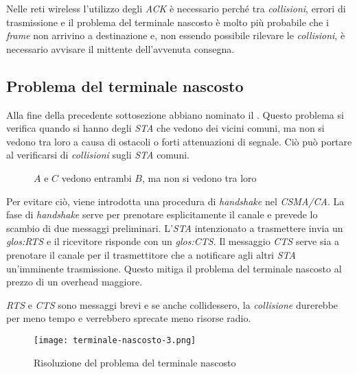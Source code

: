 \begin{note}
    Nelle reti wireless l'utilizzo degli \emph{ACK} è necessario perché
    tra \emph{collisioni}, errori di trasmissione e il problema del terminale
    nascosto è molto più probabile che i \emph{frame} non arrivino a destinazione
    e, non essendo possibile rilevare le \emph{collisioni}, è necessario avvisare
    il mittente dell'avvenuta consegna.
\end{note}

\subsection{Problema del terminale nascosto}
Alla fine della precedente sottosezione abbiano nominato il . Questo problema si verifica quando si hanno degli
\emph{STA} che vedono dei vicini comuni, ma non si vedono tra loro a causa di
ostacoli o forti attenuazioni di segnale. Ciò può portare al verificarsi di
\emph{collisioni} sugli \emph{STA} comuni.

\begin{figure}[h!]
    \centering
    \caption{$A$ e $C$ vedono entrambi $B$, ma non si vedono tra loro}
\end{figure}\noindent
Per evitare ciò, viene introdotta una procedura di \emph{handshake}
nel \emph{CSMA/CA}. La fase di \emph{handshake} serve per prenotare esplicitamente
il canale e prevede lo scambio di due messaggi preliminari. L'\emph{STA}
intenzionato a trasmettere invia un \emph{\gls{glos:RTS}} e il ricevitore
risponde con un \emph{\gls{glos:CTS}}. Il messaggio \emph{CTS} serve sia a
prenotare il canale per il trasmettitore che a notificare agli altri \emph{STA}
un'imminente trasmissione. Questo mitiga il problema del terminale nascosto al
prezzo di un overhead maggiore.

\begin{note}
    \emph{RTS} e \emph{CTS} sono messaggi brevi e se anche collidessero, la
    \emph{collisione} durerebbe per meno tempo e verrebbero sprecate meno
    risorse radio.
\end{note}

\newpage
\begin{figure}[ht!]
    \centering
    \texttt{[image: terminale-nascosto-3.png]}
    \caption{Risoluzione del problema del terminale nascosto}
\end{figure}


